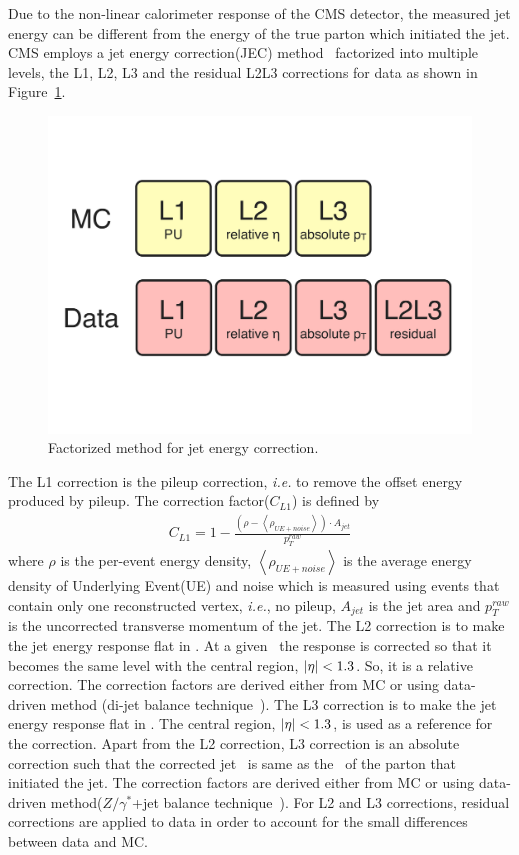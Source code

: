 Due to the non-linear calorimeter response of the CMS detector, 
the measured jet energy can be different from the energy of the true parton which 
initiated the jet. CMS employs a jet energy correction(JEC) 
method~\cite{Chatrchyan:1369486} factorized into multiple levels, 
the L1, L2, L3 and the residual L2L3 corrections for data as shown in Figure~\ref{fig:jec}. 
\begin{figure}[!hbtp]
\centering
\includegraphics[width=.95\textwidth]{figures/jec.pdf}
\caption{Factorized method for jet energy correction.}
\label{fig:jec}
\end{figure}

The L1 correction is the pileup correction, \textit{i.e.} to remove the offset energy 
produced by pileup. The correction factor($C_{L1}$) is defined by~\cite{Chatrchyan:1369486} 
\begin{eqnarray} 
C_{L1} = 1 - \frac{\left( \rho - \left<\rho_{UE+noise}\right>\right) \cdot A_{jet}}{p_T^{raw}}  \end{eqnarray} 
where $\rho$ is the per-event energy density, 
$\left<\rho_{UE+noise}\right>$ is the average energy density 
of Underlying Event(UE) and noise which is measured using events that contain only one 
reconstructed vertex, \textit{i.e.}, no pileup, 
$A_{jet}$ is the jet area
and $p_T^{raw}$ is the uncorrected transverse momentum of the jet. 
The L2 correction is to make the jet energy response flat in \Eta.  
At a given \Eta\, the response is corrected so that it becomes the same level 
with the central region, $|\eta|<1.3$. So, it is a relative correction.  
The correction factors are derived either from MC or using data-driven method
(di-jet balance technique~\cite{Chatrchyan:1369486}).
The L3 correction is to make the jet energy response flat in \pt.  
The central region, $|\eta|<1.3$, is used as a reference for the correction. 
Apart from the L2 correction, L3 correction is an absolute correction 
such that the corrected jet \pt\ is same as the \pt\ of the parton that 
initiated the jet. The correction factors are derived either from MC 
or using data-driven method($Z/\gamma^*$+jet balance technique~\cite{Chatrchyan:1369486}). 
For L2 and L3 corrections, 
residual corrections are applied to data in order to account for the small differences 
between data and MC. 

